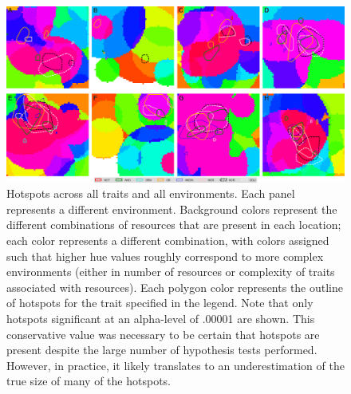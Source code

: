 \begin{figure}[t]
\begin{center}
\includegraphics[width=7in]{figs/50065_all_hotspots.png}
\caption{Hotspots across all traits and all environments. Each panel represents a different environment. Background colors represent the different combinations of resources that are present in each location; each color represents a different combination, with colors assigned such that higher hue values %
roughly correspond to more complex environments (either in number of resources or complexity of traits associated with resources). Each polygon color represents the outline of hotspots for the trait specified in the legend. Note that only hotspots significant at an alpha-level of .00001 are shown. This conservative value was necessary to be certain that hotspots are present despite the large number of hypothesis tests performed. However, in practice, it likely translates to an underestimation of the true size of many of the hotspots.}
\label{hotspots}
\end{center}
\end{figure}

